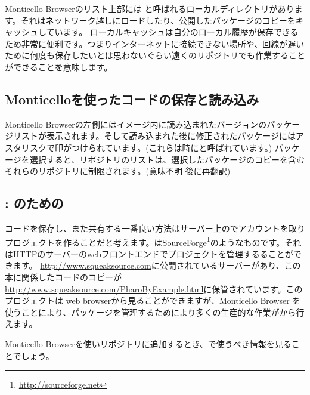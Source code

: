 \documentclass[a4paper,10pt,twoside]{book}
\begin{document}
Monticello Browserのリスト上部には と呼ばれるローカルディレクトリがあります。それはネットワーク越しにロードしたり、公開したパッケージのコピーをキャッシュしています。
ローカルキャッシュは自分のローカル履歴が保存できるため非常に便利です。つまりインターネットに接続できない場所や、回線が遅いために何度も保存したいとは思わないぐらい遠くのリポジトリでも作業することができることを意味します。


\subsection{Monticelloを使ったコードの保存と読み込み}
Monticello Browserの左側にはイメージ内に読み込まれたバージョンのパッケージリストが表示されます。そして読み込まれた後に修正されたパッケージにはアスタリスクで印がつけられています。(これらは時にと呼ばれています。) パッケージを選択すると、リポジトリのリストは、選択したパッケージのコピーを含むそれらのリポジトリに制限されます。(意味不明 後に再翻訳)



\subsection{\ind{\sqsrc}: \pharo のための} 
コードを保存し、また共有する一番良い方法は\sqsrc サーバー上のでアカウントを取りプロジェクトを作ることだと考えます。\sqsrc はSourceForge\footnote{\url{http://sourceforge.net}}のようなものです。それはHTTPのサーバーのwebフロントエンドでプロジェクトを管理するることができます。
\url{http://www.squeaksource.com}に公開されている\sqsrc サーバーがあり、この本に関係したコードのコピーが\url{http://www.squeaksource.com/PharoByExample.html}に保管されています。このプロジェクトは web browserから見ることができますが、Monticello Browser を使うことにより、パッケージを管理するためにより多くの生産的な作業が\pharo から行えます。

Monticello Browserを使いリポジトリに追加するとき、\sqsrc で使うべき情報を見ることでしょう。
\end{document}
